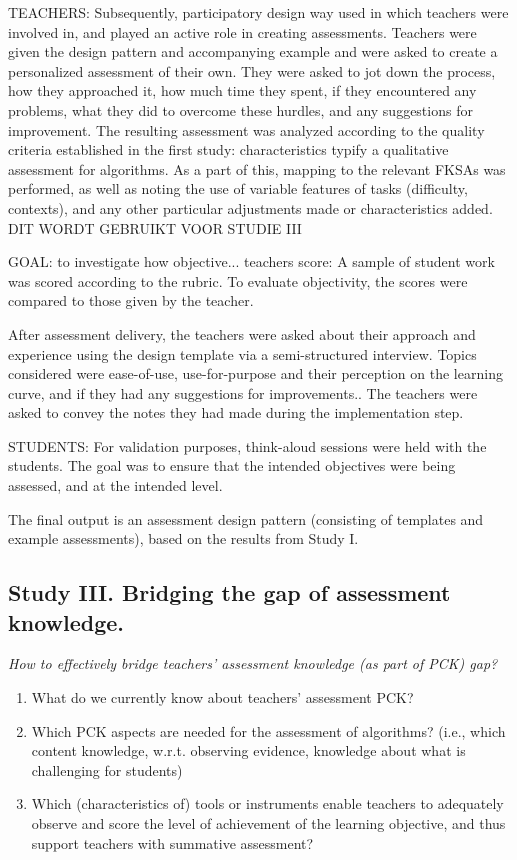 TEACHERS:
Subsequently, participatory design way used in which teachers were involved in, and played an active role in creating assessments. Teachers were given the design pattern and accompanying example and were asked to create a personalized assessment of their own. They were asked to jot down the process, how they approached it, how much time they spent, if they encountered any problems, what they did to overcome these hurdles, and any suggestions for improvement. The resulting assessment was analyzed according to the quality criteria established in the first study: characteristics typify a qualitative assessment for algorithms. As a part of this, mapping to the relevant FKSAs was performed, as well as noting the use of variable features of tasks (difficulty, contexts), and any other particular adjustments made or characteristics added. DIT WORDT GEBRUIKT VOOR STUDIE III


GOAL: to investigate how objective... teachers score: A sample of student work was scored according to the rubric. To evaluate objectivity, the scores were compared to those given by the teacher.

After assessment delivery, the teachers were asked about their approach and experience using the design template via a semi-structured interview. Topics considered were ease-of-use, use-for-purpose and their perception on the learning curve, and if they had any suggestions for improvements.. The teachers were asked to convey the notes they had made during the implementation step.


STUDENTS:
For validation purposes, think-aloud sessions were held with the students. The goal was to ensure that the intended objectives were being assessed, and at the intended level.



The final output is an assessment design pattern (consisting of templates and example assessments), based on the results from Study I.


\subsection{Study III. Bridging the gap of assessment knowledge.}
\textit{How to effectively bridge teachers' assessment knowledge (as part of PCK) gap?}

\begin{enumerate}
\item What do we currently know about teachers' assessment PCK?
\item Which PCK aspects are needed for the assessment of algorithms? (i.e., which content knowledge, w.r.t. observing evidence, knowledge about what is challenging for students)
\item Which (characteristics of) tools or instruments enable teachers to adequately observe and score the level of achievement of the learning objective, and thus support teachers with summative assessment?
\end{enumerate}

